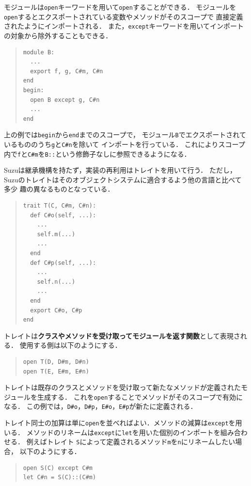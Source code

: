 \documentclass{ipsjprosym}
\begin{document}
モジュールは\verb|open|キーワードを用いて\verb|open|することができる．
モジュールを\verb|open|するとエクスポートされている変数やメソッドがそのスコープで
直接定義されたようにインポートされる．
また，\verb|except|キーワードを用いてインポートの対象から除外することもできる．
\begin{quote}
\begin{verbatim}
module B:
  ...
  export f, g, C#m, C#n
end
begin:
  open B except g, C#n
  ...
end
\end{verbatim}
\end{quote}
上の例では\verb|begin|から\verb|end|までのスコープで，
モジュール\verb|B|でエクスポートされているもののうち\verb|g|と\verb|C#n|を除いて
インポートを行っている．
これによりスコープ内で\verb|f|と\verb|C#m|を\verb|B::|という修飾子なしに参照できるようになる．

Suzuは継承機構を持たず，実装の再利用はトレイト\cite{Scharli:2003}を用いて行う．
ただし，Suzuのトレイトはそのオブジェクトシステムに適合するよう他の言語と比べて多少
趣の異なるものとなっている．
\begin{quote}
\begin{verbatim}
trait T(C, C#m, C#n):
  def C#o(self, ...):
    ...
    self.m(...)
    ...
  end
  def C#p(self, ...):
    ...
    self.n(...)
    ...
  end
  export C#o, C#p
end
\end{verbatim}
\end{quote}
トレイトは\textbf{クラスやメソッドを受け取ってモジュールを返す関数}として表現される．
使用する側は以下のようにする．
\begin{quote}
\begin{verbatim}
open T(D, D#m, D#n)
open T(E, E#m, E#n)
\end{verbatim}
\end{quote}
トレイトは既存のクラスとメソッドを受け取って新たなメソッドが定義されたモジュールを生成する．
これを\verb|open|することでメソッドがそのスコープで有効になる．
この例では，\verb|D#o|，\verb|D#p|，\verb|E#o|，\verb|E#p|が新たに定義される．

トレイト同士の加算は単に\verb|open|を並べればよい．メソッドの減算は\verb|except|を用いる．
メソッドのリネームは\verb|except|に\verb|let|を用いた個別のインポートを組み合わせる．
例えばトレイト \verb|S|によって定義されるメソッド\verb|m|を\verb|n|にリネームしたい場合，
以下のようにする．
\begin{quote}
\begin{verbatim}
open S(C) except C#m
let C#n = S(C)::(C#m)
\end{verbatim}
\end{quote}
\end{document}
